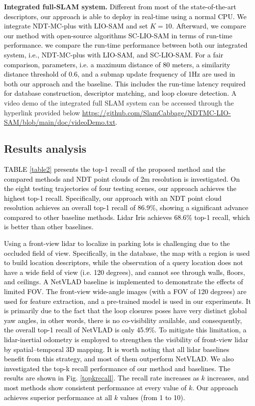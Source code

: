 \documentclass[letterpaper, 10 pt, conference]{ieeeconf}   %
\newcommand\kevin[1]{\textcolor{black}{#1}}
\begin{document}
\textbf{Integrated full-SLAM system.} \kevin{Different from most of the state-of-the-art descriptors, our approach is able to deploy in real-time using a normal CPU. We integrate NDT-MC-plus with LIO-SAM\cite{LIOSAM} and set $K=10$. Afterward, we compare our method with open-source algorithms SC-LIO-SAM in terms of run-time performance. we compare the run-time performance between both our integrated system, i.e., NDT-MC-plus with LIO-SAM, and SC-LIO-SAM. For a fair comparison, parameters, i.e. a maximum distance of 80 meters, a similarity distance threshold of 0.6, and a submap update frequency of 1Hz are used in both our approach and the baseline. This includes the run-time latency required for database construction, descriptor matching, and loop closure detection.} 
A video demo of the integrated full SLAM system can be accessed through the hyperlink provided below \url{https://github.com/SlamCabbage/NDTMC-LIO-SAM/blob/main/doc/videoDemo.txt}.

\subsection{Results analysis}

\kevin{TABLE \ref{table2} presents the top-1 recall of the proposed method and the compared methods and NDT point clouds of 2m resolution is investigated. On the eight testing trajectories of four testing scenes, our approach achieves the highest top-1 recall. Specifically, our approach with an NDT point cloud resolution achieves an overall top-1 recall of 86.9\%, showing a significant advance compared to other baseline methods. Lidar Iris achieves 68.6\% top-1 recall, which is better than other baselines.}

\kevin{Using a front-view lidar to localize in parking lots is challenging due to the occluded field of view. Specifically, in the database, the map with a region is used to build location descriptors, while the observation of a query location does not have a wide field of view (i.e. 120 degrees), and cannot see through walls, floors, and ceilings. A NetVLAD baseline is implemented to demonstrate the effects of limited FOV. The front-view wide-angle images (with a FOV of 120 degrees) are used for feature extraction, and a pre-trained model \cite{Tokyo24/7} is used in our experiments. It is primarily due to the fact that the loop closures poses have very distinct global yaw angles, in other words, there is no co-visibility available, and consequently, the overall top-1 recall of NetVLAD is only 45.9\%. To mitigate this limitation, a lidar-inertial odometry is employed to strengthen the visibility of front-view lidar by spatial–temporal 3D mapping. It is worth noting that all lidar baselines benefit from this strategy, and most of them outperform NetVLAD. We also investigated the top-k recall performance of our method and baselines. The results are shown in Fig. \ref{topkrecall}. The recall rate increases as $k$ increases, and most methods show consistent performance at every value of $k$. Our approach achieves superior performance at all $k$ values (from 1 to 10).}
\end{document}
